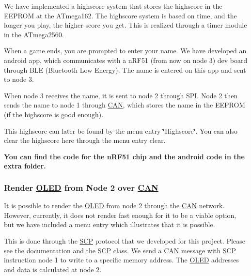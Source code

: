 We have implemented a highscore system that stores the highscore in the E\+E\+P\+R\+OM at the A\+Tmega162. The highscore system is based on time, and the longer you play, the higher score you get. This is realized through a timer module in the A\+Tmega2560.

When a game ends, you are prompted to enter your name. We have developed an android app, which communicates with a n\+R\+F51 (from now on node 3) dev board through B\+LE (Bluetooth Low Energy). The name is entered on this app and sent to node 3.

When node 3 receives the name, it is sent to node 2 through \hyperlink{namespace_s_p_i}{S\+PI}. Node 2 then sends the name to node 1 through \hyperlink{class_c_a_n}{C\+AN}, which stores the name in the E\+E\+P\+R\+OM (if the highscore is good enough).

This highscore can later be found by the menu entry \char`\"{}\+Highscore\char`\"{}. You can also clear the highscore here through the menu entry clear.

{\bfseries You can find the code for the n\+R\+F51 chip and the android code in the extra folder.}

\subsubsection*{Render \hyperlink{class_o_l_e_d}{O\+L\+ED} from Node 2 over \hyperlink{class_c_a_n}{C\+AN}}

It is possible to render the \hyperlink{class_o_l_e_d}{O\+L\+ED} from node 2 through the \hyperlink{class_c_a_n}{C\+AN} network. However, currently, it does not render fast enough for it to be a viable option, but we have included a menu entry which illustrates that it is possible.

This is done through the \hyperlink{class_s_c_p}{S\+CP} protocol that we developed for this project. Please see the documentation and the \hyperlink{class_s_c_p}{S\+CP} class. We send a \hyperlink{class_c_a_n}{C\+AN} message with \hyperlink{class_s_c_p}{S\+CP} instruction node 1 to write to a specific memory address. The \hyperlink{class_o_l_e_d}{O\+L\+ED} addresses and data is calculated at node 2. 